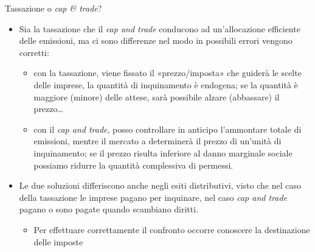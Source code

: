 \documentclass[aspectratio=64,12pt]{beamer}
\begin{document}
\begin{frame}{Tassazione o \emph{cap \& trade}?}
\begin{itemize}
\item Sia la tassazione che il \emph{cap and trade} conducono ad
  un'allocazione efficiente delle emissioni, ma ci sono differenze nel modo in
  possibili errori vengono corretti:
\begin{itemize}
\item \alert{con la tassazione}, viene fissato il «prezzo/imposta» che guiderà
le scelte delle imprese, la quantità di inquinamento è endogena;
 se la quantità è maggiore (minore) delle attese, sarà possibile alzare
(abbassare) il prezzo\dots
\item \alert{con il \emph{cap and trade}}, posso controllare in anticipo
l'ammontare totale di emissioni, mentre il mercato a determinerà il prezzo di
un'unità di inquinamento; se il prezzo risulta inferiore al danno marginale sociale possiamo
  ridurre la quantità complessiva di permessi.
\end{itemize}
\item Le due soluzioni differiscono anche negli \alert{esiti distributivi},
visto che nel caso della tassazione le imprese pagano per inquinare, nel caso
\emph{cap and trade} pagano o sono pagate quando scambiano diritti.
\begin{itemize}
\item Per effettuare correttamente il confronto occorre conoscere la
destinazione delle imposte
\end{itemize}
\end{itemize}
\end{frame}
\end{document}
